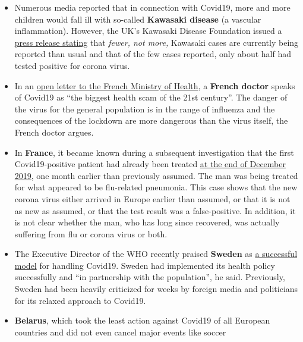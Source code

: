 \begin{itemize}
\tightlist
\item
  Numerous media reported that in connection with Covid19, more and more
  children would fall ill with so-called \textbf{Kawasaki disease} (a
  vascular inflammation). However, the UK's Kawasaki Disease Foundation
  issued a
  \href{https://www.societi.org.uk/kawasaki-disease-and-covid-19/}{press
  release stating} that \emph{fewer, not more,} Kawasaki cases are
  currently being reported than usual and that of the few cases
  reported, only about half had tested positive for corona virus.
\item
  In an
  \href{https://covidinfos.net/covid19/la-lettre-dun-praticien-hospitalier-adressee-au-ministere-de-la-sante-denonce-une-arnaque-sanitaire/604/}{open
  letter to the French Ministry of Health}, a \textbf{French doctor}
  speaks of Covid19 as ``the biggest health scam of the 21st century''.
  The danger of the virus for the general population is in the range of
  influenza and the consequences of the lockdown are more dangerous than
  the virus itself, the French doctor argues.
\item
  In \textbf{France}, it became known during a subsequent investigation
  that the first Covid19-positive patient had already been treated
  \href{https://www.reuters.com/article/us-health-coronavirus-france-retests/frances-early-covid-19-case-may-hold-clues-to-pandemics-start-idUSKBN22H15R}{at
  the end of December 2019}, one month earlier than previously assumed.
  The man was being treated for what appeared to be flu-related
  pneumonia. This case shows that the new corona virus either arrived in
  Europe earlier than assumed, or that it is not as new as assumed, or
  that the test result was a false-positive. In addition, it is not
  clear whether the man, who has long since recovered, was actually
  suffering from flu or corona virus or both.
\item
  The Executive Director of the WHO recently praised \textbf{Sweden} as
  \href{https://nypost.com/2020/04/29/who-lauds-sweden-as-model-for-resisting-coronavirus-lockdown/}{a
  successful model} for handling Covid19. Sweden had implemented its
  health policy successfully and ``in partnership with the population'',
  he said. Previously, Sweden had been heavily criticized for weeks by
  foreign media and politicians for its relaxed approach to Covid19.
\item
  \textbf{Belarus}, which took the least action against Covid19 of all
  European countries and did not even cancel major events like soccer

\end{itemize}
